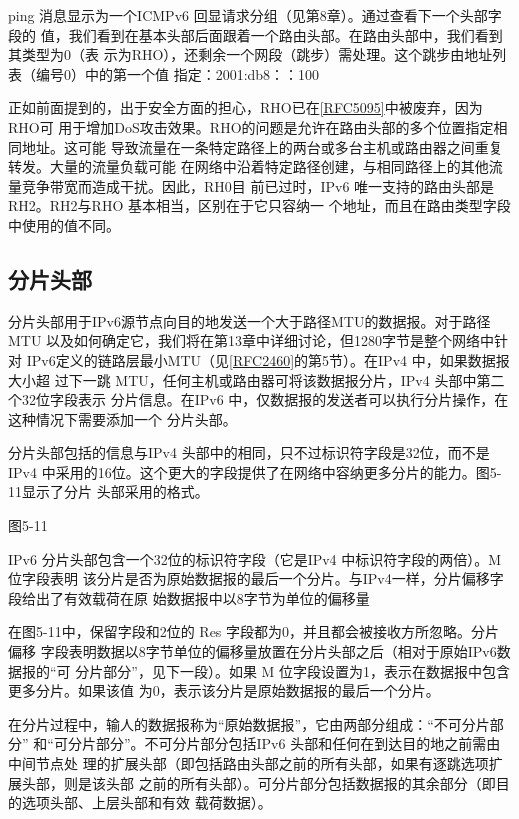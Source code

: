 ping 消息显示为一个ICMPv6 回显请求分组（见第8章）。通过查看下一个头部字段的
值，我们看到在基本头部后面跟着一个路由头部。在路由头部中，我们看到其类型为0（表
示为RHO），还剩余一个网段（跳步）需处理。这个跳步由地址列表（编号0）中的第一个值
指定：2001:db8：：100

正如前面提到的，出于安全方面的担心，RHO已在\href{https://www.rfc-editor.org/rfc/rfc5095}{[RFC5095]}中被废弃，因为RHO可
用于增加DoS攻击效果。RHO的问题是允许在路由头部的多个位置指定相同地址。这可能
导致流量在一条特定路径上的两台或多台主机或路由器之间重复转发。大量的流量负载可能
在网络中沿着特定路径创建，与相同路径上的其他流量竞争带宽而造成干扰。因此，RH0目
前已过时，IPv6 唯一支持的路由头部是RH2。RH2与RHO 基本相当，区别在于它只容纳一
个地址，而且在路由类型字段中使用的值不同。

\subsection{分片头部}
分片头部用于IPv6源节点向目的地发送一个大于路径MTU的数据报。对于路径
MTU 以及如何确定它，我们将在第13章中详细讨论，但1280字节是整个网络中针对
IPv6定义的链路层最小MTU（见\href{https://www.rfc-editor.org/rfc/rfc2460}{[RFC2460]}的第5节）。在IPv4
中，如果数据报大小超
过下一跳 MTU，任何主机或路由器可将该数据报分片，IPv4 头部中第二个32位字段表示
分片信息。在IPv6 中，仅数据报的发送者可以执行分片操作，在这种情况下需要添加一个
分片头部。

分片头部包括的信息与IPv4 头部中的相同，只不过标识符字段是32位，而不是IPv4
中采用的16位。这个更大的字段提供了在网络中容纳更多分片的能力。图5-11显示了分片
头部采用的格式。

图5-11

IPv6 分片头部包含一个32位的标识符字段（它是IPv4 中标识符字段的两倍）。M位字段表明
该分片是否为原始数据报的最后一个分片。与IPv4一样，分片偏移字段给出了有效载荷在原
始数据报中以8字节为单位的偏移量

在图5-11中，保留字段和2位的 Res 字段都为0，并且都会被接收方所忽略。分片偏移
字段表明数据以8字节单位的偏移量放置在分片头部之后（相对于原始IPv6数据报的“可
分片部分”，见下一段）。如果 M 位字段设置为1，表示在数据报中包含更多分片。如果该值
为0，表示该分片是原始数据报的最后一个分片。

在分片过程中，输人的数据报称为“原始数据报”，它由两部分组成：“不可分片部分”
和“可分片部分”。不可分片部分包括IPv6 头部和任何在到达目的地之前需由中间节点处
理的扩展头部（即包括路由头部之前的所有头部，如果有逐跳选项扩展头部，则是该头部
之前的所有头部）。可分片部分包括数据报的其余部分（即目的选项头部、上层头部和有效
载荷数据）。

